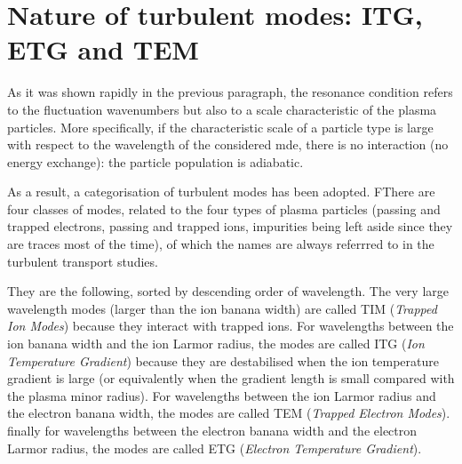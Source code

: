 		\section{Nature of turbulent modes: ITG, ETG and TEM}
		
As it was shown rapidly in the previous paragraph, the resonance condition refers to the fluctuation wavenumbers but also to a scale characteristic of the plasma particles. More specifically, if the characteristic scale of a particle type is large with respect to the wavelength of the considered mde, there is no interaction (no energy exchange): the particle population is adiabatic.

As a result, a categorisation of turbulent modes has been adopted. FThere are four classes of modes, related to the four types of plasma particles (passing and trapped electrons, passing and trapped ions, impurities being left aside since they are traces most of the time), of which the names are always referrred to in the turbulent transport studies.

They are the following, sorted by descending order of wavelength. The very large wavelength modes (larger than the ion banana width) are called TIM (\textit{Trapped Ion Modes}) because they interact with trapped ions. For wavelengths between the ion banana width and the ion Larmor radius, the modes are called ITG (\textit{Ion Temperature Gradient}) because they are destabilised when the ion temperature gradient is large (or equivalently when the gradient length is small compared with the plasma minor radius). For wavelengths between the ion Larmor radius and the electron banana width, the modes are called TEM (\textit{Trapped Electron Modes}). finally for wavelengths between the electron banana width and the electron Larmor radius, the modes are called ETG (\textit{Electron Temperature Gradient}).

